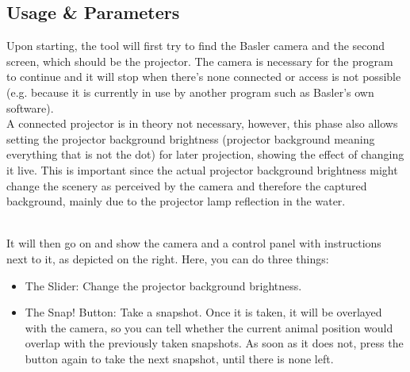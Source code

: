 \documentclass[12pt]{article}
\begin{document}
\subsection{Usage \& Parameters}
Upon starting, the tool will first try to find the Basler camera and the second screen, which should be the projector. The camera is necessary for the program to continue and it will stop when there's none connected or access is not possible (e.g. because it is currently in use by another program such as Basler's own software).\\
A connected projector is in theory not necessary, however, this phase also allows setting the projector background brightness (projector background meaning everything that is not the dot) for later projection, showing the effect of changing it live. This is important since the actual projector background brightness might change the scenery as perceived by the camera and therefore the captured background, mainly due to the projector lamp reflection in the water.\\
\\
\begin{minipage}[t]{0.45\textwidth}
	\vspace{0pt}
	It will then go on and show the camera and a control panel with instructions next to it, as depicted on the right. Here, you can do three things:
	\begin{itemize}
		\item The Slider: Change the projector background brightness.
		\item The Snap! Button: Take a snapshot. Once it is taken, it will be overlayed with the camera, so you can tell whether the current animal position would overlap with the previously taken snapshots. As soon as it does not, press the button again to take the next snapshot, until there is none left.
	\end{itemize}
\end{minipage}
\hspace*{\fill}
\end{document}
